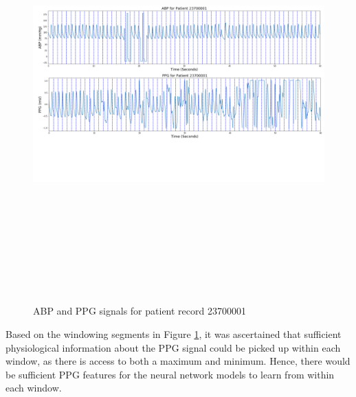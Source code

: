 \begin{figure}[H]
    \centering
    \includegraphics[width=16cm,height=16cm,keepaspectratio]{Implementation/window.png}
    \caption{ABP and PPG signals for patient record 23700001}
    \label{windowing}
\end{figure}\noindent Based on the windowing segments in Figure \ref{windowing}, it was ascertained that 
sufficient physiological information about the PPG signal could be picked up within each window, as there is access to both a maximum and minimum. Hence, 
there would be sufficient PPG features for the neural network models to learn from within each window.



